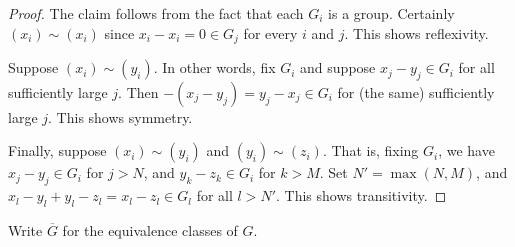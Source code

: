 \begin{proof}
The claim follows from the fact that each $G_i$ is a group. 
Certainly $(x_i) \sim (x_i)$ since $x_i - x_i = 0 \in G_j$ for 
every $i$ and $j$. This shows reflexivity.

Suppose $(x_i) \sim (y_i)$. In other words, fix $G_i$ and suppose 
$x_j - y_j \in G_i$ for all sufficiently large $j$. Then 
$-(x_j - y_j) = y_j - x_j \in G_i$ for (the same) sufficiently 
large $j$. This shows symmetry.

Finally, suppose $(x_i) \sim (y_i)$ and $(y_i) \sim (z_i)$.
That is, fixing $G_i$, we have $x_j - y_j \in G_i$ for $j > N$,
and $y_k - z_k \in G_i$ for $k > M$. Set $N' = \max(N, M)$,
and $x_l - y_l + y_l - z_l = x_l - z_l \in G_l$ for all $l > N'$.
This shows transitivity.
\end{proof}

Write $\overline{G}$ for the equivalence classes of $G$.

